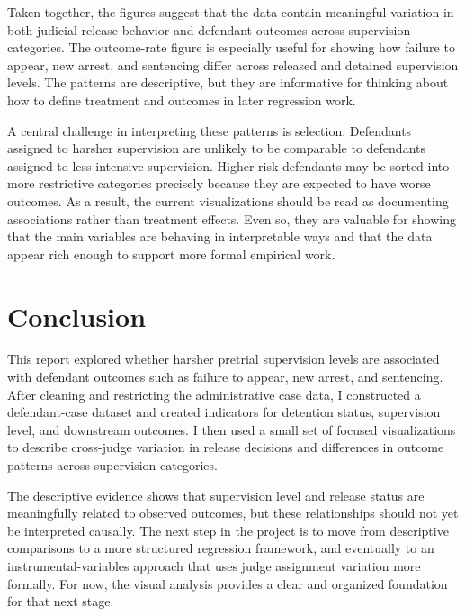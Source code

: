 \documentclass[
  11pt,
]{article}
\begin{document}
Taken together, the figures suggest that the data contain meaningful
variation in both judicial release behavior and defendant outcomes
across supervision categories. The outcome-rate figure is especially
useful for showing how failure to appear, new arrest, and sentencing
differ across released and detained supervision levels. The patterns are
descriptive, but they are informative for thinking about how to define
treatment and outcomes in later regression work.

A central challenge in interpreting these patterns is selection.
Defendants assigned to harsher supervision are unlikely to be comparable
to defendants assigned to less intensive supervision. Higher-risk
defendants may be sorted into more restrictive categories precisely
because they are expected to have worse outcomes. As a result, the
current visualizations should be read as documenting associations rather
than treatment effects. Even so, they are valuable for showing that the
main variables are behaving in interpretable ways and that the data
appear rich enough to support more formal empirical work.

\section{Conclusion}\label{conclusion}

This report explored whether harsher pretrial supervision levels are
associated with defendant outcomes such as failure to appear, new
arrest, and sentencing. After cleaning and restricting the
administrative case data, I constructed a defendant-case dataset and
created indicators for detention status, supervision level, and
downstream outcomes. I then used a small set of focused visualizations
to describe cross-judge variation in release decisions and differences
in outcome patterns across supervision categories.

The descriptive evidence shows that supervision level and release status
are meaningfully related to observed outcomes, but these relationships
should not yet be interpreted causally. The next step in the project is
to move from descriptive comparisons to a more structured regression
framework, and eventually to an instrumental-variables approach that
uses judge assignment variation more formally. For now, the visual
analysis provides a clear and organized foundation for that next stage.
\end{document}
